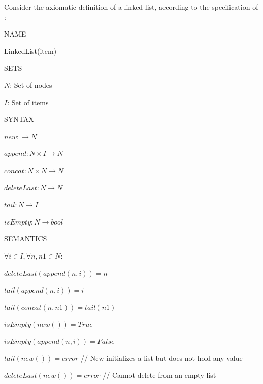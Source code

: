 \documentclass{article}
\begin{document}
Consider the axiomatic definition of a linked list, according to the specification of \cite{ADTspec}:
\begin{center}
        \parbox{11cm}{
            NAME

            \hspace{2em}LinkedList(item)

            SETS

            \hspace{2em}$N$: Set of nodes

            \hspace{2em}$I$: Set of items

            SYNTAX

            \hspace{2em}$new: \rightarrow N$

            \hspace{2em}$append: N \times I \rightarrow N$

            \hspace{2em}$concat: N \times N \rightarrow N$

            \hspace{2em}$deleteLast: N \rightarrow N$

            \hspace{2em}$tail: N \rightarrow I$

            \hspace{2em}$isEmpty: N \rightarrow bool$


            SEMANTICS

            $\forall i \in I, \forall n, n1 \in N:$

            \hspace{2em}$deleteLast(append(n, i)) = n$

            \hspace{2em}$tail(append(n, i)) = i$

            \hspace{2em}$tail(concat(n, n1)) = tail(n1)$

            \hspace{2em}$isEmpty(new()) = True$

            \hspace{2em}$isEmpty(append(n, i)) = False$

            \hspace{2em}$tail(new()) = error$ // New initializes a list but does not hold any value

            \hspace{2em}$deleteLast(new()) = error$ // Cannot delete from an empty list

    }
\end{center}
\end{document}
